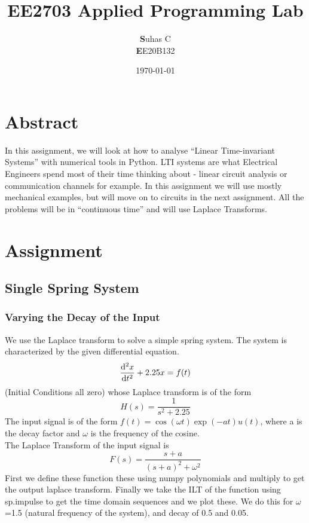 \documentclass[11pt, a4paper]{article}
\title{EE2703 Applied Programming Lab }
\author{
  \textbf Suhas C\\
  \textbf EE20B132
}\date{\today}
\begin{document}
		
\maketitle 
\section{Abstract}
In this assignment, we will look at how to analyse “Linear Time-invariant Systems”
with numerical tools in Python. LTI systems are what Electrical Engineers spend most of
their time thinking about - linear circuit analysis or communication channels for example.
In this assignment we will use mostly mechanical examples, but will move on to circuits in
the next assignment.
All the problems will be in “continuous time” and will use Laplace Transforms.


\section{Assignment}
\subsection{Single Spring System}
\subsubsection{Varying the Decay of the Input}
{
We use the Laplace transform to solve a simple spring system.
The system is characterized by the given differential equation.
\[\dv[2]{x}{t} + 2.25x = f(t) \]
(Initial Conditions all zero)
whose Laplace transform is of the form
\[H(s) =  \frac{1}{s^2+2.25}\]
The input signal is of the form 
\(f(t) = \cos{(\omega t)}\exp(-at)u(t)\),
where a is the decay factor and $\omega$ is the frequency of the cosine.\\
The Laplace Transform of the input signal is
\[ F(s) = \frac{s+a}{(s+a)^2+\omega^2 }\]
First we define these function these using numpy polynomials and multiply to get the output laplace transform.
Finally we take the ILT of the function using sp.impulse to get the time domain sequences and we plot these.
We do this for $\omega$=1.5 (natural frequency of the system), and decay of 0.5 and 0.05.
}
\end{document}
